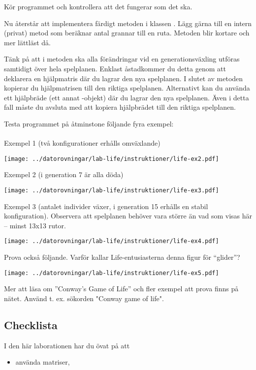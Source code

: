 \begin{Datorarbete}
Kör programmet och kontrollera att det fungerar som det ska.

\item Nu återstår att implementera färdigt metoden  i klassen .
Lägg gärna till en intern (privat) metod som beräknar antal grannar till en ruta. Metoden  blir kortare och mer lättläst då.

Tänk på att i metoden  ska alla förändringar vid en generationsväxling utföras samtidigt över hela spelplanen. Enklast åstadkommer du detta genom att deklarera en hjälpmatris där du lagrar den nya spelplanen. I slutet av metoden kopierar du hjälpmatrisen till den riktiga spelplanen. Alternativt kan du använda ett hjälpbräde (ett annat -objekt) där du lagrar den nya spelplanen. Även i detta fall måste du avsluta med att kopiera hjälpbrädet till den riktiga spelplanen.

Testa programmet på åtminstone följande fyra exempel:\\
\\
\n Exempel 1 (två konfigurationer erhålls omväxlande)
\begin{center}
\texttt{[image: ../datorovningar/lab-life/instruktioner/life-ex2.pdf]}
\end{center}

\n Exempel 2 (i generation 7 är alla döda)
\begin{center}
\texttt{[image: ../datorovningar/lab-life/instruktioner/life-ex3.pdf]}
\end{center}

\n Exempel 3 (antalet individer växer, i generation 15 erhålls en stabil
konfiguration). Observera att spelplanen behöver vara större än vad som visas här -- minst 13x13 rutor.
\begin{center}
\texttt{[image: ../datorovningar/lab-life/instruktioner/life-ex4.pdf]}
\end{center}

\n Prova också följande. Varför kallar Life-entusiasterna denna figur för \enquote{glider}?
\begin{center}
\texttt{[image: ../datorovningar/lab-life/instruktioner/life-ex5.pdf]}
\end{center}
Mer att läsa om ''Conway's Game of Life'' och fler exempel att prova finns på nätet. Använd t. ex. sökorden "Conway game of life".

	\subsection*{Checklista}
	I den här laborationen har du övat på att
	\begin{itemize}
		\item använda matriser,
		

\end{itemize}
\end{Datorarbete}
